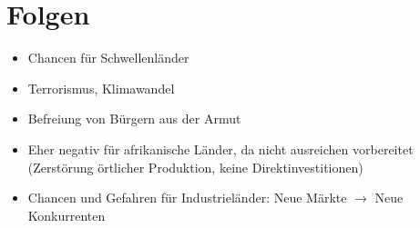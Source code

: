 \documentclass[12pt,a4paper]{report}
\begin{document}
	\section{Folgen}
	\begin{itemize}
		\item Chancen für Schwellenländer
		\item Terrorismus, Klimawandel
		\item Befreiung von Bürgern aus der Armut
		\item Eher negativ für afrikanische Länder, da nicht ausreichen vorbereitet (Zerstörung örtlicher Produktion, keine Direktinvestitionen)
		\item Chancen und Gefahren für Industrieländer: Neue Märkte $\to$ Neue Konkurrenten
	\end{itemize}
\end{document}
